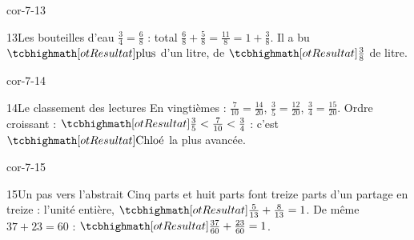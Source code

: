 \begin{blocLivre}{cor-7-13}\begin{corrige}{13}{Les bouteilles d’eau}
$\frac34=\frac68$ : total $\frac68+\frac58=\frac{11}8=1+\frac38$. Il a bu $\res{\text{plus}}$ d’un litre, de $\res{\frac38}$ de litre.
\end{corrige}\end{blocLivre}
\begin{blocLivre}{cor-7-14}\begin{corrige}{14}{Le classement des lectures}
En vingtièmes : $\frac7{10}=\frac{14}{20}$, $\frac35=\frac{12}{20}$, $\frac34=\frac{15}{20}$. Ordre croissant : $\res{\frac35<\frac7{10}<\frac34}$ : c’est $\res{\text{Chloé}}$ la plus avancée.
\end{corrige}\end{blocLivre}
\begin{blocLivre}{cor-7-15}\begin{corrige}{15}{Un pas vers l’abstrait}
Cinq parts et huit parts font treize parts d’un partage en treize : l’unité entière, $\res{\frac5{13}+\frac8{13}=1}$. De même $37+23=60$ : $\res{\frac{37}{60}+\frac{23}{60}=1}$.
\end{corrige}\end{blocLivre}
